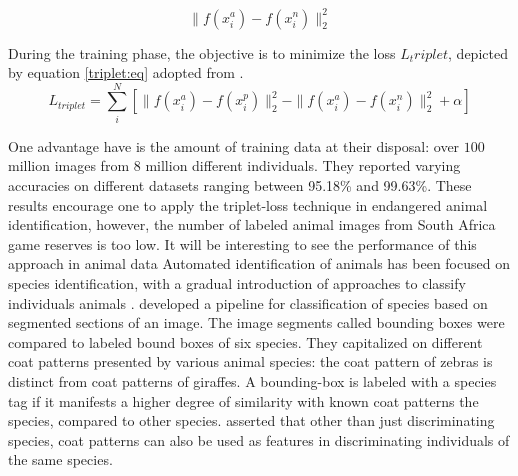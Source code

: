 \begin{equation}\label{tripletneg:eq}
     \parallel f(x_{i}^a)-f(x_{i}^n)\parallel^2_2
 \end{equation}
 
 During the training phase, the objective is to minimize the loss $L_triplet$, depicted by equation \ref{triplet:eq} adopted from \cite{schroff2015facenet}.     
 \begin{equation}\label{triplet:eq}
     L_{triplet} = \sum_{i}^N[\parallel f(x_{i}^a)-f(x_{i}^p)\parallel_{2}^2-\parallel f(x_{i}^a)-f(x_{i}^n)\parallel^2_2+\alpha] 
 \end{equation}
 
 One advantage \citeauthor{schroff2015facenet} \citeyear{schroff2015facenet} \cite{schroff2015facenet} have is the amount of training data at their disposal: over  $100$ million images from $8$ million different individuals. They reported varying accuracies on different datasets ranging between 95.18\% and 99.63\%. These results encourage one to apply the triplet-loss technique in endangered animal identification, however, the number of labeled animal images from South Africa game reserves is too low. It will be interesting to see the performance of this approach in animal data 
Automated identification of animals has been focused on species identification, with a gradual introduction of approaches to classify individuals animals \cite{norouzzadeh2018automatically}.
\citeauthor{parham2018animal} \citeyear{parham2018animal} \cite{parham2018animal} developed a pipeline for classification of species based on segmented sections of an image. The image segments called bounding boxes were compared to labeled bound boxes of six species. They capitalized on different coat patterns presented by various animal species: the coat pattern of zebras is distinct from coat patterns of giraffes. A bounding-box is labeled with a species tag if it manifests a higher degree of similarity with known coat patterns the species, compared to other species. \citeauthor{kuhl2013animal} \citeyear{kuhl2013animal} \cite{kuhl2013animal} asserted that other than just discriminating species, coat patterns can also be used as features in discriminating individuals of the same species.

